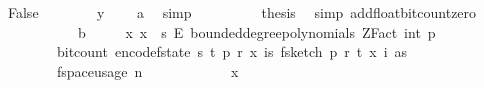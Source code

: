 \begin{isabellebody}
\ False\isanewline
\ \ \ \ \ \ \isamarkupfalse%
\ {\isachardoublequoteopen}y\ {\isacharequal}{\kern0pt}\ {}{\isachardoublequoteclose}\ \isamarkupfalse%
\ a\ \isamarkupfalse%
\ simp\isanewline
\ \ \ \ \ \ \isamarkupfalse%
\ \isamarkupfalse%
\ {\isacharquery}{\kern0pt}thesis\ \isamarkupfalse%
\ {\isacharparenleft}{\kern0pt}simp\ add{\isacharcolon}{\kern0pt}float{\isacharunderscore}{\kern0pt}bit{\isacharunderscore}{\kern0pt}count{\isacharunderscore}{\kern0pt}zero{\isacharparenright}{\kern0pt}\isanewline
\ \ \ \ \isamarkupfalse%
\isanewline
\ \ \isamarkupfalse%
\isanewline
\isanewline
\ \ \isamarkupfalse%
\ b{\isacharcolon}{\kern0pt}\ \isanewline
\ \ \ \ {\isachardoublequoteopen}{\isasymAnd}x{\isachardot}{\kern0pt}\ x\ {\isasymin}\ {\isacharparenleft}{\kern0pt}{\isacharbraceleft}{\kern0pt}{}{\isachardot}{\kern0pt}{\isachardot}{\kern0pt}{\isacharless}{\kern0pt}s{\isacharbraceright}{\kern0pt}\ {\isasymrightarrow}\isactrlsub E\ bounded{\isacharunderscore}{\kern0pt}degree{\isacharunderscore}{\kern0pt}polynomials\ {\isacharparenleft}{\kern0pt}ZFact\ {\isacharparenleft}{\kern0pt}int\ p{\isacharparenright}{\kern0pt}{\isacharparenright}{\kern0pt}\ {}{\isacharparenright}{\kern0pt}\ {\isasymLongrightarrow}\isanewline
\ \ \ \ \ \ \ \ bit{\isacharunderscore}{\kern0pt}count\ {\isacharparenleft}{\kern0pt}encode{\isacharunderscore}{\kern0pt}f{}{\isacharunderscore}{\kern0pt}state\ {\isacharparenleft}{\kern0pt}s{\isacharcomma}{\kern0pt}\ t{\isacharcomma}{\kern0pt}\ p{\isacharcomma}{\kern0pt}\ r{\isacharcomma}{\kern0pt}\ x{\isacharcomma}{\kern0pt}\ {\isasymlambda}i{\isasymin}{\isacharbraceleft}{\kern0pt}{}{\isachardot}{\kern0pt}{\isachardot}{\kern0pt}{\isacharless}{\kern0pt}s{\isacharbraceright}{\kern0pt}{\isachardot}{\kern0pt}\ f{}{\isacharunderscore}{\kern0pt}sketch\ p\ r\ t\ {\isacharparenleft}{\kern0pt}x\ i{\isacharparenright}{\kern0pt}\ as{\isacharparenright}{\kern0pt}{\isacharparenright}{\kern0pt}\ {\isasymle}\ \isanewline
\ \ \ \ \ \ \ \ f{}{\isacharunderscore}{\kern0pt}space{\isacharunderscore}{\kern0pt}usage\ {\isacharparenleft}{\kern0pt}n{\isacharcomma}{\kern0pt}\ {\isasymepsilon}{\isacharcomma}{\kern0pt}\ {\isasymdelta}{\isacharparenright}{\kern0pt}{\isachardoublequoteclose}\isanewline
\ \ \isamarkupfalse%
\ {\isacharminus}{\kern0pt}\isanewline
\ \ \ \ \isamarkupfalse%
\ x\isanewline
\ \ \ \ \isamarkupfalse%

\end{isabellebody}

